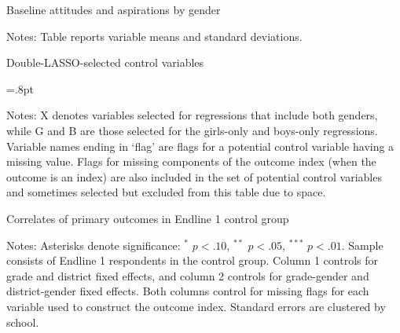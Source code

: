 \documentclass[letterpaper,12pt,pdftex]{article}
\begin{document}
\clearpage
\newpage

\begin{table}
	\tabcolsep=2.8pt
	\caption{Baseline attitudes and aspirations by gender}\label{tab_sum_stats_vars}
	\vspace{.4cm}
	\begin{center}
		\begin{small}
			
		\end{small}
	\end{center}
	\flushleft \footnotesize {Notes: Table reports variable means and standard deviations.}
\end{table}

\clearpage

\newpage
{}
\begin{table}
	\caption{Double-LASSO-selected control variables}
	\label{tab_lasso_controls}
	\tabcolsep=.8pt
	\tiny
	\centering
	
	\flushleft \footnotesize {Notes: X denotes variables selected for regressions that include both genders, while G and B are those selected for the girls-only and boys-only regressions. Variable names ending in `flag' are flags for a potential control variable having a missing value. Flags for missing components of the outcome index (when the outcome is an index) are also included in the set of potential control variables and sometimes selected but excluded from this table due to space.}
\end{table}
\restoregeometry

\clearpage
\newpage

\begin{table}
\tabcolsep=3.8pt
		\caption{Correlates of primary outcomes in Endline 1 control group}
		\label{tab_benchmark}
			\vspace{.4cm}
		\begin{center}
			\small
			
		\end{center}
\flushleft \footnotesize {Notes: Asterisks denote significance: $^*$ $p < .10$, $^{**}$ $p < .05$, $^{***}$ $p < .01$. Sample consists of Endline 1 respondents in the control group. Column 1 controls for grade and district fixed effects, and column 2 controls for grade-gender and district-gender fixed effects. Both columns control for missing flags for each variable used to construct the outcome index. Standard errors are clustered by school.}
\end{table}
\end{document}
